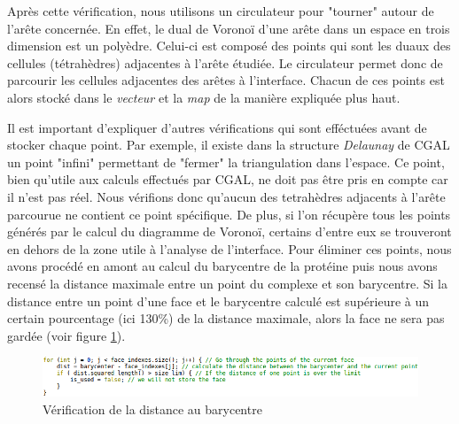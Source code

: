 Après cette vérification, nous utilisons un circulateur pour "tourner" autour de l'arête
concernée. En effet, le dual de Voronoï d'une arête dans un espace en trois dimension
est un polyèdre. Celui-ci est composé des points qui sont les duaux des cellules (tétrahèdres)
adjacentes à l'arête étudiée. Le circulateur permet donc de parcourir les cellules adjacentes
des arêtes à l'interface. Chacun de ces points est alors stocké dans le \textit{vecteur} et
la \textit{map} de la manière expliquée plus haut.

Il est important d'expliquer d'autres vérifications qui sont efféctuées avant de stocker
chaque point. Par exemple, il existe dans la structure \textit{Delaunay} de CGAL
un point "infini" permettant de "fermer" la triangulation dans l'espace. Ce point, bien
qu'utile aux calculs effectués par CGAL, ne doit pas être pris en compte car il n'est pas réel.
Nous vérifions donc qu'aucun des tetrahèdres adjacents à l'arête parcourue ne contient
ce point spécifique. De plus, si l'on récupère tous les points générés par le calcul du
diagramme de Voronoï, certains d'entre eux se trouveront en dehors de la zone utile à l'analyse
de l'interface. Pour éliminer ces points, nous avons procédé en amont au calcul
du barycentre de la protéine puis nous avons recensé la distance maximale entre un point du complexe
et son barycentre. Si la distance entre un point d'une face et le barycentre calculé
est supérieure à un certain pourcentage (ici 130\%) de la distance maximale, alors
la face ne sera pas gardée (voir figure \ref{fig::check_max_dist}).
\begin{figure}[ht]
\centering
  \includegraphics[width=\textwidth]{figures/check_max_dist.png}
  \caption{Vérification de la distance au barycentre}
  \label{fig::check_max_dist}
\end{figure}


